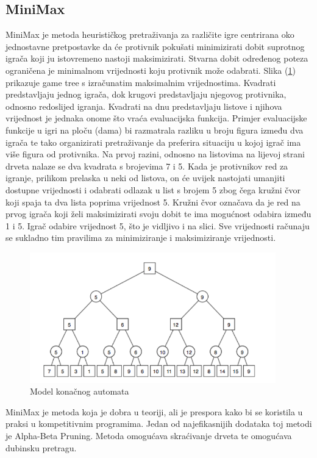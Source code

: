 \documentclass[a4paper,12pt]{foi}
\begin{document}
\subsection{MiniMax}
MiniMax je metoda heurističkog pretraživanja za različite igre centrirana oko jednostavne pretpostavke da će protivnik pokušati minimizirati dobit suprotnog igrača koji ju istovremeno nastoji maksimizirati. Stvarna dobit određenog poteza ograničena je minimalnom vrijednosti koju protivnik može odabrati. Slika (\ref{slika-2}) prikazuje game tree s izračunatim maksimalnim vrijednostima. Kvadrati predstavljaju jednog igrača, dok krugovi predstavljaju njegovog protivnika, odnosno redoslijed igranja. Kvadrati na dnu predstavljaju listove i njihova vrijednost je jednaka onome što vraća evaluacijska funkcija. Primjer evaluacijske funkcije u igri na ploču (dama) bi razmatrala razliku u broju figura između dva igrača te tako organizirati pretraživanje da preferira situaciju u kojoj igrač ima više figura od protivnika. Na prvoj razini, odnosno na listovima na lijevoj strani drveta nalaze se dva kvadrata s brojevima 7 i 5. Kada je protivnikov red za igranje, prilikom prelaska u neki od listova, on će uvijek nastojati umanjiti dostupne vrijednosti i odabrati odlazak u list s brojem 5 zbog čega kružni čvor koji spaja ta dva lista poprima vrijednost 5. Kružni čvor označava da je red na prvog igrača koji želi maksimizirati svoju dobit te ima mogućnost odabira između 1 i 5. Igrač odabire vrijednost 5, što je vidljivo i na slici. Sve vrijednosti računaju se sukladno tim pravilima za minimiziranje i maksimiziranje vrijednosti.

\begin{figure}[h]
\centering 
\includegraphics[width=0.95\textwidth]{minimax.png}
\caption{Model konačnog automata \citep{FinnsonH2007}}
\label{slika-2}
\end{figure}
MiniMax je metoda koja je dobra u teoriji, ali je prespora kako bi se koristila u praksi u kompetitivnim programima. Jedan od najefikasnijih dodataka toj metodi je Alpha-Beta Pruning. Metoda omogućava skraćivanje drveta te omogućava dubinsku pretragu.
\end{document}
